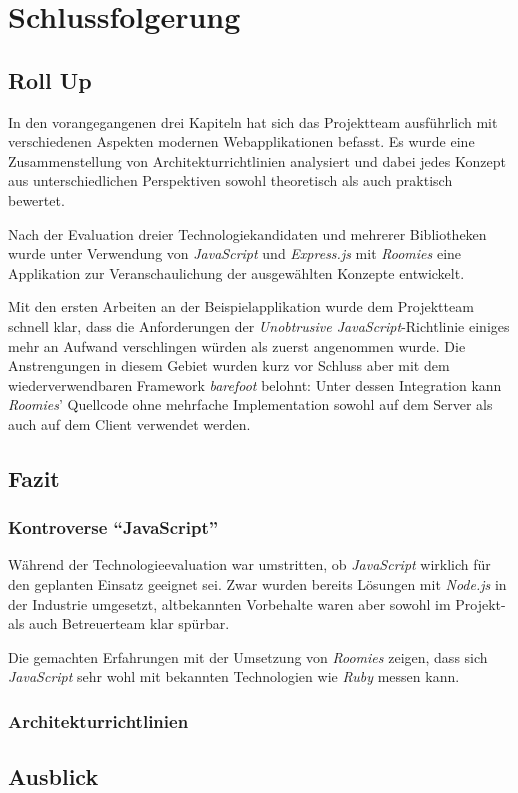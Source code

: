 \chapter{Schlussfolgerung}

\section*{Roll Up}
In den vorangegangenen drei Kapiteln hat sich das Projektteam ausführlich mit verschiedenen Aspekten modernen Webapplikationen befasst. Es wurde eine Zusammenstellung von Architekturrichtlinien analysiert und dabei jedes Konzept aus unterschiedlichen Perspektiven sowohl theoretisch als auch praktisch bewertet.

Nach der Evaluation dreier Technologiekandidaten und mehrerer Bibliotheken wurde unter Verwendung von \emph{JavaScript} und \emph{Express.js} mit \emph{Roomies} eine Applikation zur Veranschaulichung der ausgewählten Konzepte entwickelt.

Mit den ersten Arbeiten an der Beispielapplikation wurde dem Projektteam schnell klar, dass die Anforderungen der \emph{Unobtrusive JavaScript}-Richtlinie einiges mehr an Aufwand verschlingen würden als zuerst angenommen wurde. Die Anstrengungen in diesem Gebiet wurden kurz vor Schluss aber mit dem wiederverwendbaren Framework \emph{barefoot} belohnt: Unter dessen Integration kann \emph{Roomies}' Quellcode ohne mehrfache Implementation sowohl auf dem Server als auch auf dem Client verwendet werden.


\section*{Fazit}
\subsection*{Kontroverse ``JavaScript''}
Während der Technologieevaluation war umstritten, ob \emph{JavaScript} wirklich für den geplanten Einsatz geeignet sei. Zwar wurden bereits Lösungen mit \emph{Node.js} in der Industrie umgesetzt, altbekannten Vorbehalte waren aber sowohl im Projekt- als auch Betreuerteam klar spürbar.

Die gemachten Erfahrungen mit der Umsetzung von \emph{Roomies} zeigen, dass sich \emph{JavaScript} sehr wohl mit bekannten Technologien wie \emph{Ruby} messen kann.

\subsection*{Architekturrichtlinien}



\section*{Ausblick}


